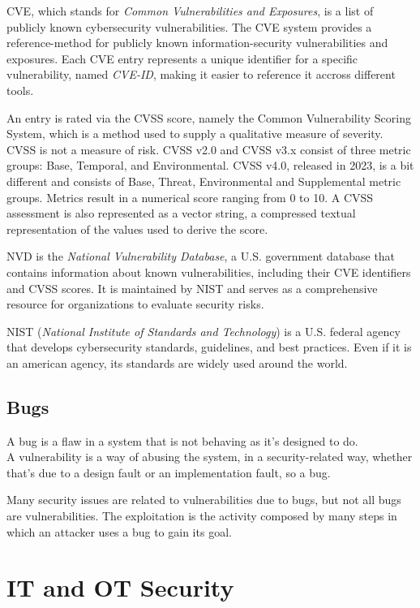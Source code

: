 CVE, which stands for \textit{Common Vulnerabilities and Exposures}, is a list of publicly known cybersecurity vulnerabilities. The CVE system provides a reference-method for publicly known information-security vulnerabilities and exposures. Each CVE entry represents a unique identifier for a specific vulnerability, named \textit{CVE-ID}, making it easier to reference it accross different tools. 

An entry is rated via the CVSS score, namely the Common Vulnerability Scoring System, which is a method used to supply a qualitative measure of severity. CVSS is not a measure of risk. CVSS v2.0 and CVSS v3.x consist of three metric groups: Base, Temporal, and Environmental. CVSS v4.0, released in 2023, is a bit different and consists of Base, Threat, Environmental and Supplemental metric groups. Metrics result in a numerical score ranging from 0 to 10. A CVSS assessment is also represented as a vector string, a compressed textual representation of the values used to derive the score.~\cite{cvss-metrics}


NVD is the \textit{National Vulnerability Database}, a U.S. government database that contains information about known vulnerabilities, including their CVE identifiers and CVSS scores. It is maintained by NIST and serves as a comprehensive resource for organizations to evaluate security risks.

NIST (\textit{National Institute of Standards and Technology}) is a U.S. federal agency that develops cybersecurity standards, guidelines, and best practices. Even if it is an american agency, its standards are widely used around the world.

\subsection{Bugs}

A bug is a flaw in a system that is not behaving as it's designed to do.\\
A vulnerability is a way of abusing the system, in a security-related way, whether that's due to a design fault or an implementation fault, so a bug.

Many security issues are related to vulnerabilities due to bugs, but not all bugs are vulnerabilities. The exploitation is the activity composed by many steps in which an attacker uses a bug to gain its goal.

\section{IT and OT Security}
 
